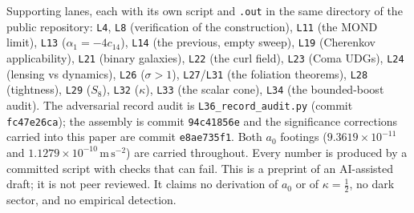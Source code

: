 \documentclass[11pt,letterpaper]{article}
\newcommand{\ms}{\,\mathrm{m\,s^{-2}}}
\begin{document}
Supporting lanes, each with its own script and \texttt{.out} in the same directory of the public repository: \texttt{L4}, \texttt{L8} (verification of the construction), \texttt{L11} (the MOND limit), \texttt{L13} ($\alpha_1=-4c_{14}$), \texttt{L14} (the previous, empty sweep), \texttt{L19} (Cherenkov applicability), \texttt{L21} (binary galaxies), \texttt{L22} (the curl field), \texttt{L23} (Coma UDGs), \texttt{L24} (lensing vs dynamics), \texttt{L26} ($\sigma>1$), \texttt{L27}/\texttt{L31} (the foliation theorems), \texttt{L28} (tightness), \texttt{L29} ($S_8$), \texttt{L32} ($\kappa$), \texttt{L33} (the scalar cone), \texttt{L34} (the bounded-boost audit). The adversarial record audit is \texttt{L36\_record\_audit.py} (commit \texttt{fc47e26ca}); the assembly is commit \texttt{94c41856e} and the significance corrections carried into this paper are commit \texttt{e8ae735f1}. Both $a_0$ footings ($9.3619\times10^{-11}$ and $1.1279\times10^{-10}\ms$) are carried throughout. Every number is produced by a committed script with checks that can fail. This is a preprint of an AI-assisted draft; it is not peer reviewed. It claims no derivation of $a_0$ or of $\kappa=\tfrac12$, no dark sector, and no empirical detection.
\end{document}
